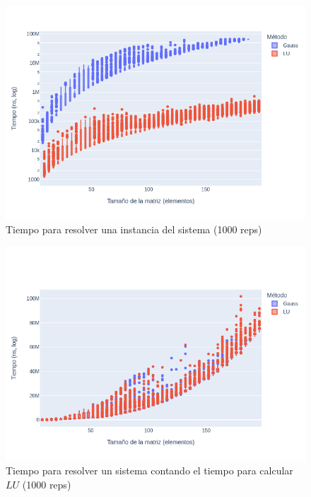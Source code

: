 \documentclass[12pt]{article}
\begin{document}
\begin{figure}[H]
\centering
\includegraphics[scale=0.5]{times.1.t_solve}
\caption{Tiempo para resolver una instancia del sistema (1000 reps)}
\label{fig:solve.time}
\end{figure}

\begin{figure}[H]
\centering
\includegraphics[scale=0.5]{times.1.t_solve_lu}
\caption{Tiempo para resolver un sistema contando el tiempo para calcular \(LU\) (1000 reps)}
\label{fig:solve.lu.time}
\end{figure}
\end{document}
